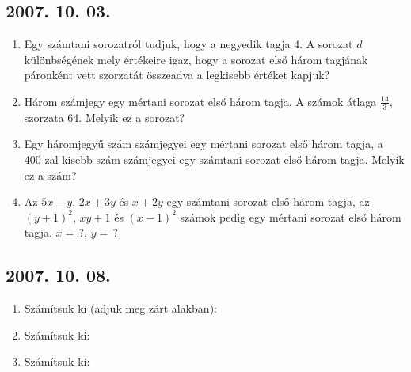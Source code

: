 \subsection*{2007. 10. 03.}
\begin{enumerate}
\item Egy számtani sorozatról tudjuk, hogy a negyedik tagja 4.
A sorozat $d$ különbségének mely értékeire igaz, hogy a sorozat első három tagjának páronként vett szorzatát összeadva a legkisebb értéket kapjuk?
\item Három számjegy egy mértani sorozat első három tagja. A számok átlaga $\frac{14}{3}$, szorzata 64. Melyik ez a sorozat?
\item Egy háromjegyű szám számjegyei egy mértani sorozat első három tagja, a 400-zal kisebb szám számjegyei egy számtani sorozat első három tagja. Melyik ez a szám?
\item Az $5x-y$, $2x+3y$ és $x+2y$ egy számtani sorozat első három tagja,
az $(y+1)^2$, $xy+1$ és $(x-1)^2$ számok pedig egy mértani sorozat első három tagja. $x=\,?$, $y=\,?$
\end{enumerate}

\subsection*{2007. 10. 08.}
\begin{enumerate}
\item Számítsuk ki (adjuk meg zárt alakban):
\item Számítsuk ki:
\item Számítsuk ki: 
\end{enumerate}

